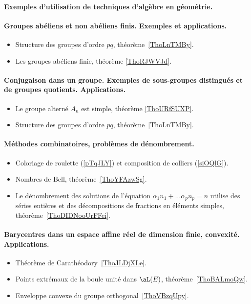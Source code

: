 \paragraph{Exemples d'utilisation de techniques d'algèbre en géométrie.}



\paragraph{Groupes abéliens et non abéliens finis. Exemples et applications.}
\begin{itemize}
    \item Structure des groupes d'ordre \( pq\), théorème~\ref{ThoLnTMBy}.
    \item Les groupes abéliens finie, théorème \ref{ThoRJWVJd}.
\end{itemize}
\paragraph{Conjugaison dans un groupe. Exemples  de  sous-groupes  distingués  et de groupes quotients. Applications.}
\begin{itemize}
    \item Le groupe alterné \( A_n\) est simple, théorème \ref{ThoURfSUXP}.
    \item Structure des groupes d'ordre \( pq\), théorème~\ref{ThoLnTMBy}.
\end{itemize}
\paragraph{Méthodes combinatoires, problèmes de dénombrement.}
\begin{itemize}
    \item Coloriage de roulette (\ref{pTqJLY}) et composition de colliers (\ref{siOQlG}).
    \item Nombres de Bell, théorème~\ref{ThoYFAzwSg}.
    \item Le dénombrement des solutions de l'équation \( \alpha_1 n_1+\ldots \alpha_pn_p=n\) utilise des séries entières et des décompositions de fractions en éléments simples, théorème~\ref{ThoDIDNooUrFFei}.
\end{itemize}
\paragraph{Barycentres dans un espace affine réel de dimension finie, convexité. Applications.}
\begin{itemize}
    \item Théorème de Carathéodory~\ref{ThoJLDjXLe}.
    \item Points extrémaux de la boule unité dans \( \aL(E)\), théorème~\ref{ThoBALmoQw}.
    \item Enveloppe convexe du groupe orthogonal~\ref{ThoVBzqUpy}.
\end{itemize}
